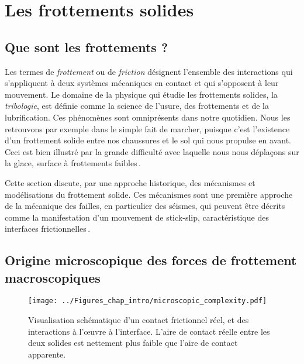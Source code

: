 
\section{Les frottements solides}
\label{sec:frot}

\subsection{Que sont les frottements ?}

Les termes de \textit{frottement} ou de \textit{friction} désignent l'ensemble des interactions qui s'appliquent à deux systèmes mécaniques en contact et qui s'opposent à leur mouvement.
Le domaine de la physique qui étudie les frottements solides, la \textit{tribologie}, est définie comme la science de l'usure, des frottements et de la lubrification.
Ces phénomènes sont omniprésents dans notre quotidien. Nous les retrouvons par exemple dans le simple fait de marcher, puisque c'est l'existence d'un frottement solide entre nos chaussures et le sol qui nous propulse en avant. Ceci est bien illustré par la grande difficulté avec laquelle
nous nous déplaçons sur la glace,
surface à frottements faibles\,\cite{bowden_friction_1953}.


Cette section discute, par une approche historique, des mécanismes et modélisations du frottement solide. Ces mécanismes sont une première approche de la mécanique des failles, en particulier des séismes, qui peuvent être décrits comme la manifestation d'un mouvement de stick-slip, caractéristique des interfaces frictionnelles\,\cite{brace_stick-slip_1966}. 

\subsection{Origine microscopique des forces de frottement macroscopiques}

\begin{figure}[htb]
\centering
\texttt{[image: ../Figures\_chap\_intro/microscopic\_complexity.pdf]}
\caption[Complexité d'une interface réelle]{Visualisation schématique d'un contact frictionnel réel, et des interactions à l'œuvre à l'interface. L'aire de contact réelle entre les deux solides est nettement plus faible que l'aire de contact apparente.}
\label{fig:asperit}
\end{figure}




